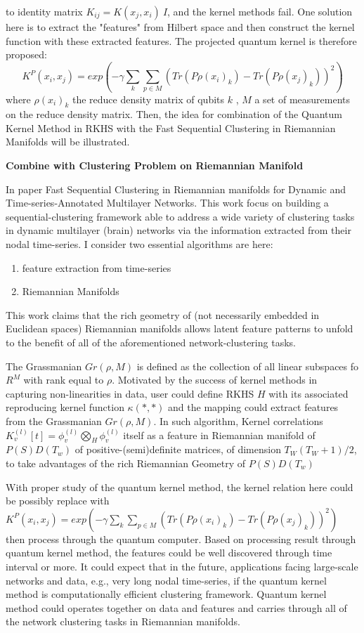 \documentclass{article}
\begin{document}
to identity matrix $K_{ij} = K(x_j,x_i) ~ I$, 
and the kernel methods fail. One solution here is 
to extract the "features" from Hilbert space and 
then construct the kernel function with 
these extracted features. The projected quantum 
kernel is therefore proposed: 
\begin{equation}
  K^P (x_i,x_j) = exp(-\gamma \sum_k \sum_{p \in M} 
  (Tr(P \rho(x_i)_k)-Tr(P \rho(x_j)_k))^2)
\end{equation}
where $\rho(x_i)_k$ the reduce density matrix of 
qubits $k$ , $M$ a set of measurements on 
the reduce density matrix. Then, the idea for combination of 
the Quantum Kernel Method in RKHS with the
Fast Sequential Clustering in Riemannian Manifolds will be 
illustrated.

\textbf{Combine with Clustering Problem on Riemannian Manifold}

In paper Fast Sequential Clustering in Riemannian
manifolds for Dynamic and Time-series-Annotated Multilayer Networks. This
work focus on building a sequential-clustering framework able to address
a wide variety of clustering tasks in dynamic multilayer (brain) networks
via the information extracted from their nodal time-series.
I consider two essential algorithms are here:
\begin{enumerate}
  \item feature extraction from time-series
  \item Riemannian Manifolds
\end{enumerate}
This work claims that the rich geometry of 
(not necessarily embedded in Euclidean spaces) Riemannian manifolds 
allows latent feature patterns to unfold to the benefit of all of 
the aforementioned network-clustering tasks.

The Grassmanian $Gr(\rho, M)$ is defined as the collection 
of all linear subspaces fo $R^M$ with rank equal to $\rho$. 
Motivated by the success of kernel methods in capturing 
non-linearities in data, user could define RKHS $H$ with its associated
reproducing kernel function $\kappa(*,*)$ and the mapping 
could extract features from the Grassmanian $Gr(\rho, M)$. In such 
algorithm, Kernel correlations 
$K_v^{(l)}[t] = \phi_v^{(l)} \bigotimes_H \phi_v^{(l)}$ itself 
as a feature in Riemannian manifold of $P(S)D(T_w)$ of 
positive-(semi)definite matrices, of dimension $T_W (T_W+1)/2$,
to take advantages of the rich Riemannian Geometry of $P(S)D(T_w)$

With proper study of the quantum kernel method, the kernel relation 
here could be possibly replace with $
  K^P (x_i,x_j) = exp(-\gamma \sum_k \sum_{p \in M} 
  (Tr(P \rho(x_i)_k)-Tr(P \rho(x_j)_k))^2)
$
then process through the quantum computer. Based on processing 
result through quantum kernel method, the features could be well 
discovered through time interval or more. It could expect that in 
the future, applications facing large-scale networks and data, e.g., very long 
nodal time-series, if the quantum kernel method is computationally efficient clustering 
framework.  Quantum kernel method could operates together 
on data and features 
and carries through all of the network clustering tasks in 
Riemannian manifolds. 
\end{document}
